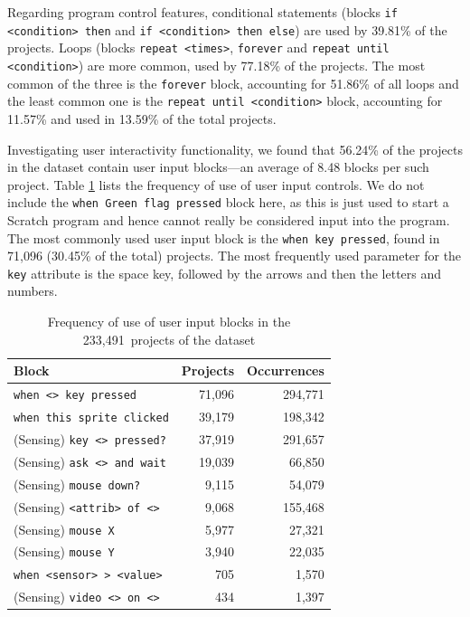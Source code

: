 \documentclass{sig-alternate}
\newcommand{\nScriptPrograms}{233,491}
\begin{document}
Regarding program control features, conditional statements (blocks \texttt{if <condition> then} and \texttt{if <condition> then else}) are used by 39.81\% of the projects. Loops (blocks \texttt{repeat <times>}, \texttt{forever} and \texttt{repeat until <condition>}) are more common, used by 77.18\% of the projects. The most common of the three is the \texttt{forever} block, accounting for 51.86\% of all loops and the least common one is the \texttt{repeat until <condition>} block, accounting for 11.57\% and used in 13.59\% of the total projects.
	
Investigating user interactivity functionality, we found that 56.24\% of the projects in the dataset contain user input blocks---an average of 8.48 blocks per such project. Table \ref{tbl-userinput} lists the frequency of use of user input controls. We do not include the \texttt{when Green flag pressed} block here, as this is just used to start a Scratch program and hence cannot really be considered input into the program. The most commonly used user input block is the \texttt{when key pressed}, found in 71,096 (30.45\% of the total) projects. The most frequently used parameter for the \texttt{key} attribute is the space key, followed by the arrows and then the letters and numbers.

\begin{table}
	\centering
	\begin{tabular}{lrr}
		\hline
		\textbf{Block}&\textbf{Projects}&\textbf{Occurrences}\\
		\hline
	\texttt{when <> key pressed}&71,096&294,771\\
	\texttt{when this sprite clicked}&39,179&198,342\\
	(Sensing) \texttt{key <> pressed?}&37,919&291,657\\
	(Sensing) \texttt{ask <> and wait}&19,039&66,850\\
	(Sensing) \texttt{mouse down?}&9,115&54,079\\
	(Sensing) \texttt{<attrib> of <>}&9,068&155,468\\
	(Sensing) \texttt{mouse X}&5,977&27,321\\
	(Sensing) \texttt{mouse Y}&3,940&22,035\\
	\texttt{when <sensor> > <value>}&705&1,570\\
	(Sensing) \texttt{video <> on <>}&434&1,397\\
		\hline
	\end{tabular}
	\caption{Frequency of use of user input blocks in the \nScriptPrograms~projects of the dataset}
	\label{tbl-userinput}
\end{table}
\end{document}
